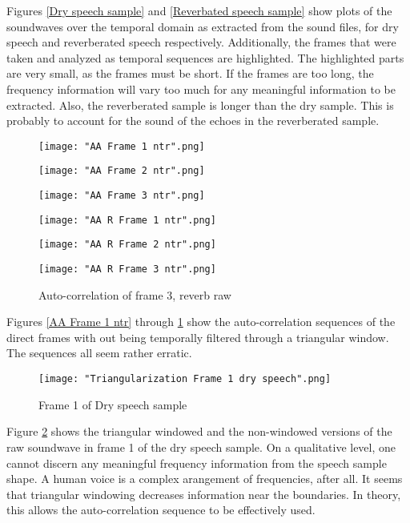 \documentclass[12pt]{article}
\begin{document}
Figures \ref{Dry speech sample} and \ref{Reverbated speech sample} show plots of the soundwaves over the temporal domain as extracted from the sound files, for dry speech and reverberated speech respectively. Additionally, the frames that were taken and analyzed as temporal sequences are highlighted. The highlighted parts are very small, as the frames must be short. If the frames are too long, the frequency information will vary too much for any meaningful information to be extracted.\cite{aa} Also, the reverberated sample is longer than the dry sample. This is probably to account for the sound of the echoes in the reverberated sample.

\begin{figure}[H]
	\texttt{[image: "AA Frame 1 ntr".png]}
	\caption{Auto-correlation of frame 1, dry, raw}\label{AA Frame 1 ntr}
	\endminipage\hfill
	\texttt{[image: "AA Frame 2 ntr".png]}
	\caption{Auto-correlation of frame 2, dry, raw}\label{AA Frame 2 ntr}
	\endminipage\hfill
	\texttt{[image: "AA Frame 3 ntr".png]}
	\caption{Auto-correlation of frame 3, dry, raw}\label{AA Frame 3 ntr}
	\endminipage\hfill
	\texttt{[image: "AA R Frame 1 ntr".png]}
	\caption{Auto-correlation of frame 1, reverb, raw}\label{AA R Frame 1 ntr}
	\endminipage\hfill
	\texttt{[image: "AA R Frame 2 ntr".png]}
	\caption{Auto-correlation of frame 2, reverb, raw}\label{AA R Frame 2 ntr}
	\endminipage\hfill
	\texttt{[image: "AA R Frame 3 ntr".png]}
	\caption{Auto-correlation of frame 3, reverb raw}\label{AA R Frame 3 ntr}
	\endminipage\hfill
\end{figure}

Figures \ref{AA Frame 1 ntr} through \ref{AA R Frame 3 ntr} show the auto-correlation sequences of the direct frames with out being temporally filtered through a triangular window. The sequences all seem rather erratic.

\begin{figure}[H]
	\texttt{[image: "Triangularization Frame 1 dry speech".png]}
	\caption{Frame 1 of Dry speech sample}\label{Triangularization Frame 1 dry speech}
	\endminipage\hfill
\end{figure}

Figure \ref{Triangularization Frame 1 dry speech} shows the triangular windowed and the non-windowed versions of the raw soundwave in frame 1 of the dry speech sample. On a qualitative level, one cannot discern any meaningful frequency information from the speech sample shape. A human voice is a complex arangement of frequencies, after all. It seems that triangular windowing decreases information near the boundaries. In theory, this allows the auto-correlation sequence to be effectively used.
\end{document}
